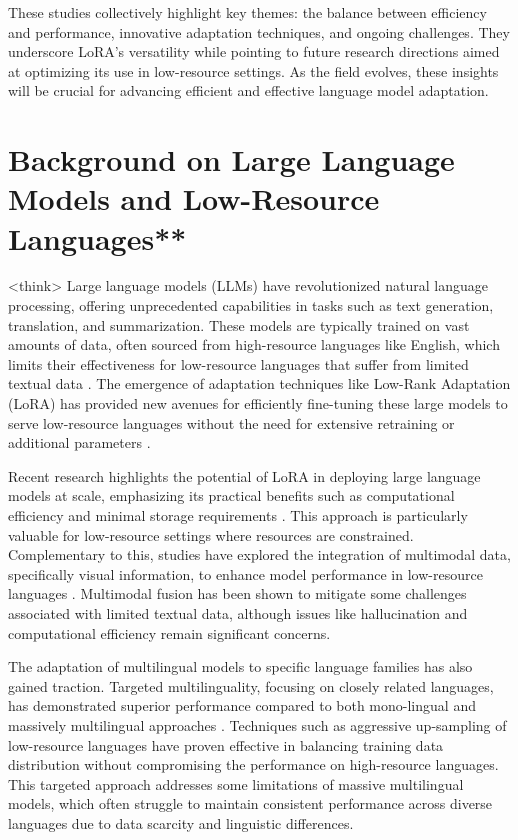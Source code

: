 \documentclass[conference]{IEEEtran}
\begin{document}
These studies collectively highlight key themes: the balance between efficiency and performance, innovative adaptation techniques, and ongoing challenges. They underscore LoRA's versatility while pointing to future research directions aimed at optimizing its use in low-resource settings. As the field evolves, these insights will be crucial for advancing efficient and effective language model adaptation.

\section{Background on Large Language Models and Low-Resource Languages**}
<think>
Large language models (LLMs) have revolutionized natural language processing, offering unprecedented capabilities in tasks such as text generation, translation, and summarization. These models are typically trained on vast amounts of data, often sourced from high-resource languages like English, which limits their effectiveness for low-resource languages that suffer from limited textual data \cite{b1}. The emergence of adaptation techniques like Low-Rank Adaptation (LoRA) has provided new avenues for efficiently fine-tuning these large models to serve low-resource languages without the need for extensive retraining or additional parameters \cite{b2}.

Recent research highlights the potential of LoRA in deploying large language models at scale, emphasizing its practical benefits such as computational efficiency and minimal storage requirements \cite{b1}. This approach is particularly valuable for low-resource settings where resources are constrained. Complementary to this, studies have explored the integration of multimodal data, specifically visual information, to enhance model performance in low-resource languages \cite{b3}. Multimodal fusion has been shown to mitigate some challenges associated with limited textual data, although issues like hallucination and computational efficiency remain significant concerns.

The adaptation of multilingual models to specific language families has also gained traction. Targeted multilinguality, focusing on closely related languages, has demonstrated superior performance compared to both mono-lingual and massively multilingual approaches \cite{b4}. Techniques such as aggressive up-sampling of low-resource languages have proven effective in balancing training data distribution without compromising the performance on high-resource languages. This targeted approach addresses some limitations of massive multilingual models, which often struggle to maintain consistent performance across diverse languages due to data scarcity and linguistic differences.
\end{document}
